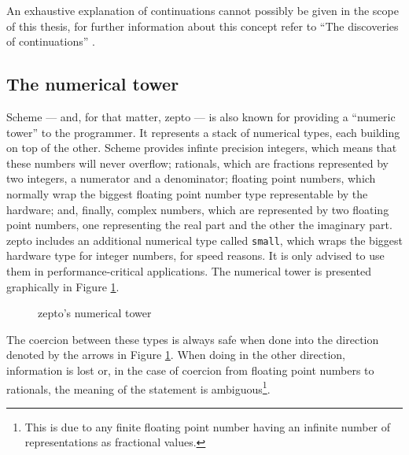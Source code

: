 \documentclass[oneside,11pt,xetex]{scrbook}
\begin{document}
An exhaustive explanation of continuations cannot possibly be given in the scope
of this thesis, for further information about this concept refer to ``The discoveries
of continuations'' \parencite{CONT}.

\subsection{The numerical tower}
\label{numbers}

Scheme --- and, for that matter, zepto --- is also known for providing a ``numeric
tower'' to the programmer. It represents a stack of numerical types, each building
on top of the other. Scheme provides infinte precision integers, which means that
these numbers will never overflow; rationals, which are fractions represented by
two integers, a numerator and a denominator; floating point numbers, which normally
wrap the biggest floating point number type representable by the hardware; and, finally,
complex numbers, which are represented by two floating point numbers, one representing
the real part and the other the imaginary part. zepto includes an additional numerical
type called \texttt{small}, which wraps the biggest hardware type for integer numbers,
for speed reasons. It is only advised to use them in performance-critical applications.
The numerical tower is presented graphically in Figure \ref{fig:numtower}.

\begin{figure}[H]
\centering
{}
\caption{zepto's numerical tower}
\label{fig:numtower}
\end{figure}

The coercion between these types is always safe when done into the direction denoted
by the arrows in Figure \ref{fig:numtower}. When doing in the other direction, information
is lost or, in the case of coercion from floating point numbers to rationals, the meaning
of the statement is ambiguous\footnote{This is due to any finite floating point number
having an infinite number of representations as fractional values.}.
\end{document}
